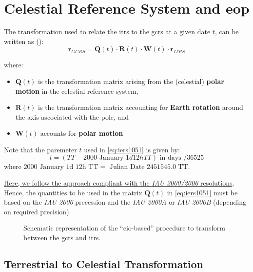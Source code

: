 \chapter{Celestial Reference System and \gls{eop}}
\label{ch:celestial-rf-and-eop}

The transformation used to relate the \gls{itrs} to the \gls{gcrs} at a 
given date $t$, can be written as (\cite{iers2010}):
\begin{equation}
    \bm{r}_{GCRS} = \bm{Q}(t) \cdot \bm{R}(t) \cdot \bm{W}(t) \cdot \bm{r}_{ITRS}
    \label{eq:iers1051}
\end{equation}

where:
\begin{itemize}
    \item $\bm{Q}(t)$ is the transformation matrix arising from the
    (celestial) \textbf{polar motion} in the celestial reference system,
    \item $\bm{R}(t)$ is the transformation matrix accounting for 
    \textbf{Earth rotation} around the axis ascociated with the pole, and
    \item $\bm{W}(t)$ accounts for \textbf{polar motion}
\end{itemize}

Note that the paremeter $t$ used in \ref{eq:iers1051} is given by:
\begin{equation}
    t = \left( TT - 2000 \text{ January } 1d 12h TT \right)
    \text{ in days } / 36525
\end{equation}
where $2000 \text{ January 1d 12h TT} = \text{ Julian Date } 2451545.0 \text{ TT}$.

\ul{Here, we follow the approach compliant with the \emph{IAU 2000/2006} 
resolutions}. Hence, the quantities to be used in the matrix $\bm{Q}(t)$ in 
\ref{eq:iers1051} must be based on the \emph{IAU 2006} precession and the 
\emph{IAU 2000A} or \emph{IAU 2000B} (depending on required precision).

\begin{figure}
\centering

\caption{Schematic representation of the ``\gls{cio}-based'' procedure to 
  transform between the \gls{gcrs} and \gls{itrs}.}
\label{fig:gcrs-to-itrs}
\end{figure}

\section{Terrestrial to Celestial Transformation}
\label{sec:ter2cel-trans}

